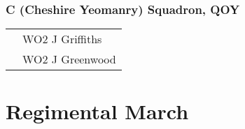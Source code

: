 \subsection*{C (Cheshire Yeomanry) Squadron, QOY}

\begin{tabular}{>{\raggedleft}p{30mm}l}
       & WO2 J Griffiths \\
  2017 & WO2 J Greenwood \\
\end{tabular}

\vspace{20mm}

\pagebreak

\chapter{Regimental March}


